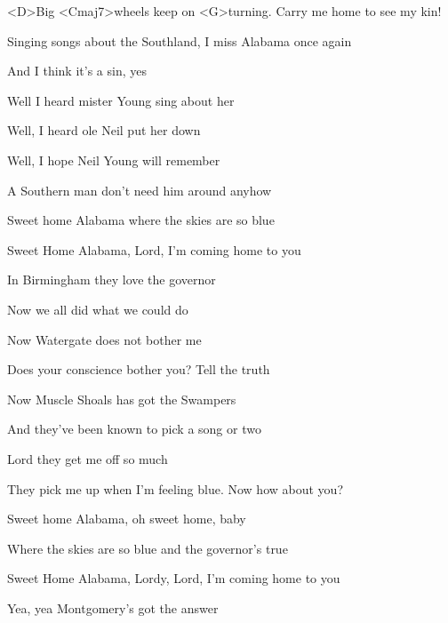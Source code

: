 

\zs
<D>Big <Cmaj7>wheels keep on <G>turning.
Carry me home to see my kin!

Singing songs about the Southland,
I miss Alabama once again

And I think it's a sin, yes
\ks

\zs
Well I heard mister Young sing about her

Well, I heard ole Neil put her down

Well, I hope Neil Young will remember

A Southern man don't need him around anyhow
\ks

\zr
Sweet home Alabama
where the skies are so blue

Sweet Home Alabama,
Lord, I'm coming home to you
\kr

\zs
In Birmingham they love the governor

Now we all did what we could do

Now Watergate does not bother me

Does your conscience bother you?
Tell the truth
\ks

\zr \kr

\zs
Now Muscle Shoals has got the Swampers

And they've been known to pick a song or two

Lord they get me off so much

They pick me up when I'm feeling blue.
Now how about you?
\ks

\zr \kr

\zr
Sweet home Alabama,
oh sweet home, baby

Where the skies are so blue
and the governor's true
\kr

\zr
Sweet Home Alabama, Lordy, Lord, I'm coming home to you

Yea, yea Montgomery's got the answer
\kr

\kp
